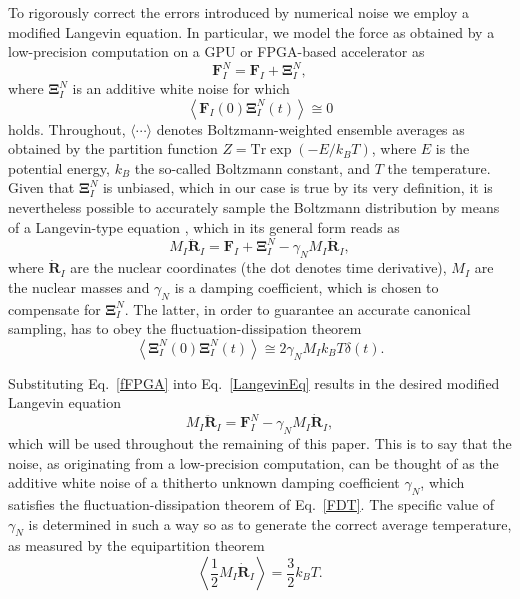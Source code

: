 \documentclass[format=acmsmall,authorversion,nonacm,timestamp,urlbreakonhyphens]{acmart}
\begin{document}
To rigorously correct the errors introduced by numerical noise we employ a modified Langevin equation. In particular, we model the force as obtained by a low-precision computation on a GPU or FPGA-based accelerator as
\begin{equation} \label{fFPGA}
\textbf{F}_{I}^{N} = \textbf{F}_{I} + \mathbf{\Xi }_{I}^{N},
\end{equation}
where $\mathbf{\Xi }_{I}^{N}$ is an additive white noise for which
\begin{equation} \label{CrossCorr}
 \left \langle \textbf{F}_{I}\left ( 0 \right ) \mathbf{\Xi } _{I}^{N}\left ( t \right )\right \rangle \cong  0
\end{equation}
holds. Throughout, $\langle \cdots \rangle$ denotes Boltzmann-weighted ensemble averages as obtained by the partition function $Z=\text{Tr} \exp(-E/k_B T)$, where $E$ is the potential energy, $k_B$ the so-called Boltzmann constant, and $T$ the temperature. Given that $\mathbf{\Xi }_{I}^{N}$ is unbiased, which in our case is true by its very definition, it is nevertheless possible to accurately sample the Boltzmann distribution by means of a Langevin-type equation \cite{Krajewski,Richters,Karhan}, which in its general form reads as
\begin{equation} \label{LangevinEq}
M_{I}\ddot{\textbf{R}}_{I}=\textbf{F}_{I}+\mathbf{\Xi }_{I}^{N}-\gamma _{N}M_{I}\dot{\textbf{R}}_{I},
\end{equation}
where $\dot{\textbf{R}}_{I}$ are the nuclear coordinates (the dot denotes time derivative), $M_I$ are the nuclear masses and $\gamma _{N}$ is a damping coefficient,
which is chosen to compensate for \(\mathbf{\Xi }_{I}^{N}\). The latter, in order to guarantee an accurate canonical sampling, has to obey
the fluctuation-dissipation theorem
\begin{equation}
\left \langle \mathbf{\Xi }_{I}^{N}\left ( 0 \right ) \mathbf{\Xi }_{I}^{N}\left ( t \right ) \right \rangle \cong  2 \gamma_{N} M_I k_{B} T  \delta \left ( t \right ).
\label{FDT}
\end{equation}

Substituting Eq.~\ref{fFPGA} into Eq.~\ref{LangevinEq} results in the desired modified Langevin equation
\begin{equation} \label{modLangevin}
M_{I}\ddot{\textbf{R}}_{I} = \textbf{F}_{I}^{N}-\gamma _{N}M_{I}\dot{\textbf{R}}_{I},
\end{equation}
which will be used throughout the remaining of this paper. This is to say that the noise, as originating from a low-precision computation, can be thought of as the additive white noise of a thitherto unknown damping coefficient $\gamma_N$, which satisfies the fluctuation-dissipation theorem of Eq.~\ref{FDT}.  The specific value of $\gamma_N$ is determined in such a way so as to generate the correct average temperature, as measured by the equipartition theorem
\begin{equation}
\left\langle \frac{1}{2} M_I \dot{\textbf{R}}_{I} \right\rangle = \frac{3}{2} k_B T.
\label{EquiPartTheorem}
\end{equation}
\end{document}
